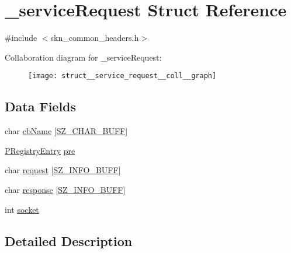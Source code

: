 \hypertarget{struct__service_request}{\section{\+\_\+service\+Request Struct Reference}
\label{struct__service_request}
}


{\ttfamily \#include $<$skn\+\_\+common\+\_\+headers.\+h$>$}



Collaboration diagram for \+\_\+service\+Request\+:\nopagebreak
\begin{figure}[H]
\begin{center}
\leavevmode
\texttt{[image: struct\_\_service\_request\_\_coll\_\_graph]}
\end{center}
\end{figure}
\subsection*{Data Fields}
\begin{DoxyCompactItemize}
\item 
char \hyperlink{struct__service_request_aab7831722782ba05f0c94087598a941e}{cb\+Name} \mbox{[}\hyperlink{skn__common__headers_8h_a8d2978ad614b0de81c60483e706d9306}{S\+Z\+\_\+\+C\+H\+A\+R\+\_\+\+B\+U\+F\+F}\mbox{]}
\item 
\hyperlink{skn__common__headers_8h_ac4f78e564b456af8e033cbc1275db23e}{P\+Registry\+Entry} \hyperlink{struct__service_request_acf8d45e7f9cb65b555217aae74cd72c5}{pre}
\item 
char \hyperlink{struct__service_request_ad347b2a07388ec9d9d33756f1a1ef235}{request} \mbox{[}\hyperlink{skn__common__headers_8h_a442d5e93bd9c9d8eb4532aba62b5f86c}{S\+Z\+\_\+\+I\+N\+F\+O\+\_\+\+B\+U\+F\+F}\mbox{]}
\item 
char \hyperlink{struct__service_request_ad4e98b9d21fad17ba82dba6a9b5f6562}{response} \mbox{[}\hyperlink{skn__common__headers_8h_a442d5e93bd9c9d8eb4532aba62b5f86c}{S\+Z\+\_\+\+I\+N\+F\+O\+\_\+\+B\+U\+F\+F}\mbox{]}
\item 
int \hyperlink{struct__service_request_aa867fef3928c7511f50a494662311d13}{socket}
\end{DoxyCompactItemize}


\subsection{Detailed Description}


